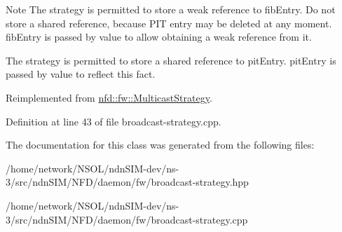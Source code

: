 \begin{DoxyNote}{Note}
The strategy is permitted to store a weak reference to fib\+Entry. Do not store a shared reference, because P\+IT entry may be deleted at any moment. fib\+Entry is passed by value to allow obtaining a weak reference from it. 

The strategy is permitted to store a shared reference to pit\+Entry. pit\+Entry is passed by value to reflect this fact. 
\end{DoxyNote}


Reimplemented from \hyperlink{classnfd_1_1fw_1_1MulticastStrategy_a3dede97a8433b762348568de7d7ae122}{nfd\+::fw\+::\+Multicast\+Strategy}.



Definition at line 43 of file broadcast-\/strategy.\+cpp.



The documentation for this class was generated from the following files\+:\begin{DoxyCompactItemize}
\item 
/home/network/\+N\+S\+O\+L/ndn\+S\+I\+M-\/dev/ns-\/3/src/ndn\+S\+I\+M/\+N\+F\+D/daemon/fw/broadcast-\/strategy.\+hpp\item 
/home/network/\+N\+S\+O\+L/ndn\+S\+I\+M-\/dev/ns-\/3/src/ndn\+S\+I\+M/\+N\+F\+D/daemon/fw/broadcast-\/strategy.\+cpp\end{DoxyCompactItemize}
